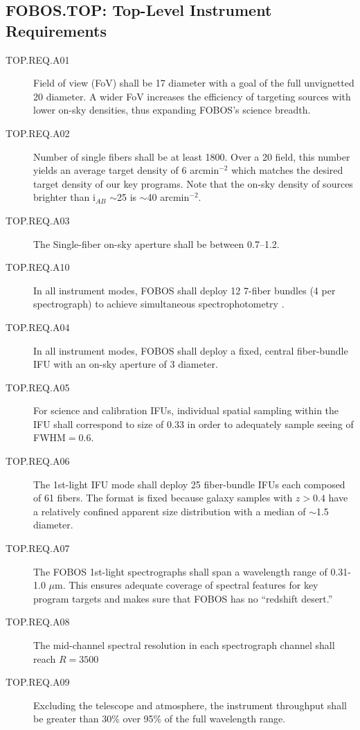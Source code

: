 \documentclass[preprint,11pt]{aastex}
\begin{document}
\subsection{FOBOS.TOP: Top-Level Instrument Requirements}

\begin{description}

\item [TOP.REQ.A01] Field of view (FoV) shall be 17\arcmin{} diameter with a goal of the full unvignetted 20\arcmin{} diameter.  A wider FoV increases the efficiency of targeting sources with lower on-sky densities, thus expanding FOBOS's science breadth.

\item [TOP.REQ.A02] Number of single fibers shall be at least 1800.  Over a 20\arcmin{} field, this number yields an average target density of 6 arcmin$^{-2}$ which matches the desired target density of our key programs.  Note that the on-sky density of sources brighter than i$_{AB}$ $\sim$25 is $\sim$40 arcmin$^{-2}$.

\item [TOP.REQ.A03] The Single-fiber on-sky aperture shall be between 0.7--1.2\arcsec{}.

\item [TOP.REQ.A10] In all instrument modes, FOBOS shall deploy 12 7-fiber bundles (4 per spectrograph) to achieve simultaneous spectrophotometry \citep[see][]{yan16}.  

\item [TOP.REQ.A04] In all instrument modes, FOBOS shall deploy a fixed, central fiber-bundle IFU with an on-sky aperture of 3\arcsec{} diameter.

\item [TOP.REQ.A05] For science and calibration IFUs, individual spatial sampling within the IFU shall correspond to size of 0.33\arcsec{} in order to adequately sample seeing of FWHM$ = 0.6$\arcsec.

\item [TOP.REQ.A06] The 1st-light IFU mode shall deploy 25 fiber-bundle IFUs each composed of 61 fibers.  The format is fixed because galaxy samples with $z > 0.4$ have a relatively confined apparent size distribution with a median of  $\sim$1.5\arcsec{} diameter.

\item [TOP.REQ.A07] The FOBOS 1st-light spectrographs shall span a wavelength range of 0.31-1.0 $\mu$m.  This ensures adequate coverage of spectral features for key program targets and makes sure that FOBOS has no ``redshift desert.''


\item [TOP.REQ.A08] The mid-channel spectral resolution in each spectrograph channel shall reach $R = 3500$

\item [TOP.REQ.A09] Excluding the telescope and atmosphere, the instrument throughput shall be greater than 30\% over 95\% of the full wavelength range.

\end{description}
\end{document}
